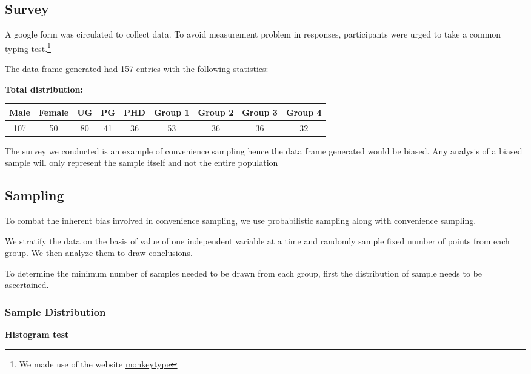 \documentclass[12pt,a4paper]{report}
\begin{document}
\subsection*{\LARGE{Survey}}

A google form was circulated to collect data. To avoid measurement problem in responses, participants were urged to take a common typing test.\footnote{We made use of the website \href{https://monkeytype.com/}{monkeytype}}

The data frame generated had 157 entries with the following statistics:

\vspace{2mm}


\begin{center}
  \textbf{Total distribution:}\\
  \vspace{0.5cm}
\begin{tabular}{ |c|c|c|c|c|c|c|c|c|}
  \hline
  Male & Female & UG & PG & PHD & Group 1 & Group 2 & Group 3 & Group 4 \\
  \hline
  107 & 50 & 80 & 41 & 36 & 53 & 36 & 36 & 32 \\ 
  \hline
\end{tabular}
\end{center}
\vspace{2mm}

\noindent The survey we conducted is an example of convenience sampling hence the data frame generated would be biased. Any analysis of a biased sample will only represent the sample itself and not the entire population 

\newpage
\subsection*{\LARGE{Sampling}}

To combat the inherent bias involved in convenience sampling, we use probabilistic sampling along with convenience sampling.

We stratify the data on the basis of value of one independent variable at a time and randomly sample fixed number of points from each group. We then analyze them to draw conclusions.

To determine the minimum number of samples needed to be drawn from each group, first the distribution of sample needs to be ascertained.

\subsubsection*{\Large{Sample Distribution}}
\textbf{\large{Histogram test}}
\end{document}
